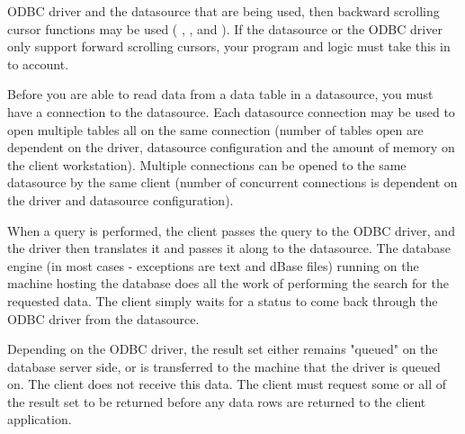 \begin{twocollist}
{ODBC driver and the datasource that are being used, then backward 
scrolling cursor functions may be used (
, 
, and 
). If the datasource or the 
ODBC driver only support forward scrolling cursors, your program and logic 
must take this in to account.}
\end{twocollist}

Before you are able to read data from a data table in a datasource, you must 
have a connection to the datasource. Each datasource connection may be used 
to open multiple tables all on the same connection (number of tables open are 
dependent on the driver, datasource configuration and the amount of memory on 
the client workstation). Multiple connections can be opened to the same 
datasource by the same client (number of concurrent connections is dependent 
on the driver and datasource configuration).

When a query is performed, the client passes the query to the ODBC driver, 
and the driver then translates it and passes it along to the datasource. The 
database engine (in most cases - exceptions are text and dBase files) running 
on the machine hosting the database does all the work of performing the search 
for the requested data. The client simply waits for a status to come back 
through the ODBC driver from the datasource. 

Depending on the ODBC driver, the result set either remains "queued" on the 
database server side, or is transferred to the machine that the driver is 
queued on. The client does not receive this data. The client must request 
some or all of the result set to be returned before any data rows are 
returned to the client application.

